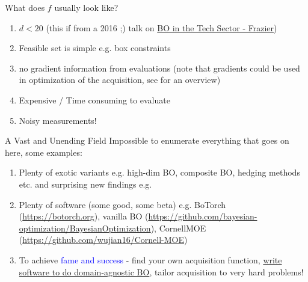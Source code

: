 \documentclass[usenames,dvipsnames]{beamer}
\theoremstyle{definition}
\let\oldcite=\cite
\renewcommand{\cite}[2][]{\textcolor{blue}{\oldcite[#1]{#2}}}
\begin{document}
\begin{frame}{What does $f$ usually look like?}
    \begin{enumerate}
        \item $d < 20$ (this if from a 2016 ;) talk on \href{https://web.archive.org/web/20210726193918/http://mcqmc2016.stanford.edu/Frazier-Peter.pdf}{BO in the Tech Sector - Frazier})
        
        \item Feasible set is simple e.g. box constraints
        
        \item no gradient information from evaluations (note that gradients could be used in optimization of the acquisition, see \cite{wilson_maximizing_2018} for an overview)
        
        \item Expensive / Time consuming to evaluate
        
        \item Noisy measurements!
    \end{enumerate}
\end{frame}


\begin{frame}{A Vast and Unending Field}
Impossible to enumerate everything that goes on here, some examples:
\begin{enumerate}
    \item Plenty of exotic variants e.g. high-dim BO, composite BO, hedging methods etc.  \cite{eriksson_scalable_2020,miller_targeted_2024,astudillo_bayesian_2019,brochu_portfolio_2011} and surprising new findings e.g. \cite{hvarfner_vanilla_2024} 

    \item Plenty of software (some good, some beta) e.g. BoTorch (\url{https://botorch.org}), vanilla BO (\url{https://github.com/bayesian-optimization/BayesianOptimization}), CornellMOE (\url{https://github.com/wujian16/Cornell-MOE})

    \item To achieve \textcolor{blue}{fame and success} - find your own acquisition function, \href{https://techcrunch.com/2020/10/29/intel-acquires-sigopt-a-specialist-in-modeling-optimization-to-boost-its-ai-business/}{write software to do domain-agnostic BO}, tailor acquisition to very hard problems!
\end{enumerate}
    
\end{frame}
\end{document}
